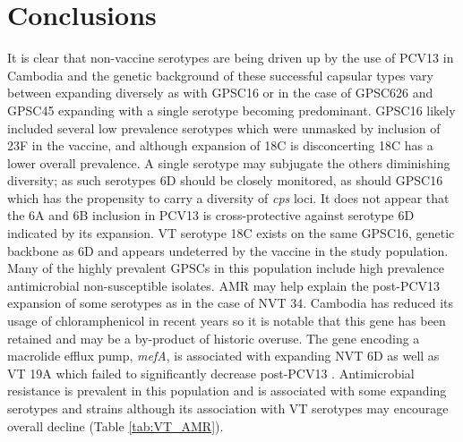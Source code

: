 \documentclass{article}
\begin{document}
\section{Conclusions}
It is clear that non-vaccine serotypes are being driven up by the use of PCV13 in Cambodia and the genetic background of these successful capsular types vary between expanding diversely as with GPSC16 or in the case of GPSC626 and GPSC45 expanding with a single serotype becoming predominant. GPSC16 likely included several low prevalence serotypes which were unmasked by inclusion of 23F in the vaccine, and although expansion of 18C is disconcerting 18C has a lower overall prevalence. A single serotype may subjugate the others diminishing diversity; as such serotypes 6D should be closely monitored, as should GPSC16 which has the propensity to carry a diversity of \textit{cps} loci. It does not appear that the 6A and 6B inclusion in PCV13 is cross-protective against serotype 6D indicated by its expansion. VT serotype 18C exists on the same GPSC16, genetic backbone as 6D and appears undeterred by the vaccine in the study population. 
\\Many of the highly prevalent GPSCs in this population include high prevalence antimicrobial non-susceptible isolates. AMR may help explain the post-PCV13 expansion of some serotypes as in the case of NVT 34. Cambodia has reduced its usage of chloramphenicol in recent years so it is notable that this gene has been retained and may be a by-product of historic overuse. The gene encoding a macrolide efflux pump, \textit{mefA}, is associated with expanding NVT 6D as well as VT 19A which failed to significantly decrease post-PCV13 . Antimicrobial resistance is prevalent in this population and is associated with some expanding serotypes and strains although its association with VT serotypes may encourage overall decline (Table \ref{tab:VT_AMR}). 
\end{document}

